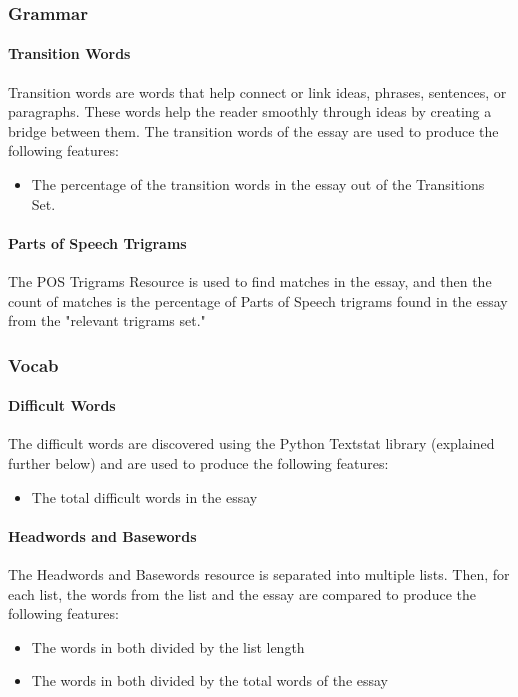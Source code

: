 \subsubsection{Grammar }

\paragraph{Transition Words}
Transition words are words that help connect or link ideas, phrases, sentences, or paragraphs. These words help the reader smoothly through ideas by creating a bridge between them. The transition words of the essay  are used to produce the following features:
\begin{itemize}
 \item The percentage of the transition words in the essay out of the Transitions Set. 
\end{itemize}

\paragraph{Parts of Speech Trigrams}The POS Trigrams Resource is used to find matches in the essay, and then the count of matches is the percentage of Parts of Speech trigrams found in the essay from the "relevant trigrams set."

\subsubsection{Vocab }

\paragraph{Difficult Words} The difficult words are discovered using the Python Textstat library (explained further below) and are used to produce the following features:
\begin{itemize}
 \item The total difficult words in the essay
\end{itemize}

\paragraph{Headwords and Basewords} The Headwords and Basewords resource is separated into multiple lists. Then, for each list, the words from the list and the essay are compared to produce the following features:
\begin{itemize}
 \item The words in both divided by the list length
 \item The words in both divided by the total words of the essay
\end{itemize}

